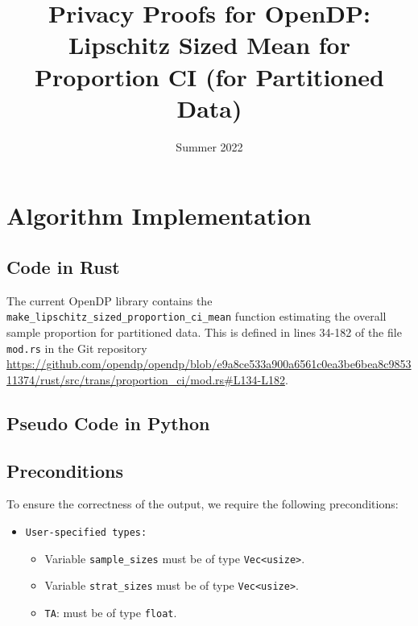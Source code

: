 \documentclass[11pt,a4paper]{article}
\title{Privacy Proofs for OpenDP: Lipschitz Sized Mean for Proportion CI (for Partitioned Data)}
\author{}
\date{Summer 2022}
\begin{document}
\maketitle
\tableofcontents


\section{Algorithm Implementation}





\subsection{Code in Rust}



The current OpenDP library contains the \texttt{make\_lipschitz\_sized\_proportion\_ci\_mean} function estimating the overall sample proportion for partitioned data. This is defined 
in lines 34-182 of the file \texttt{mod.rs}
in the Git repository \url{https://github.com/opendp/opendp/blob/e9a8ce533a900a6561c0ea3be6bea8c985311374/rust/src/trans/proportion_ci/mod.rs#L134-L182}.



\subsection{Pseudo Code in Python} \label{sec:pseudocode}

\subsection*{Preconditions}
To ensure the correctness of the output, we require the following preconditions:

\begin{itemize}
    \item \texttt{User-specified types:}
    \begin{itemize}
        \item Variable \texttt{sample\_sizes} must be of type \texttt{Vec<usize>}. 
        \item Variable \texttt{strat\_sizes} must be of type \texttt{Vec<usize>}. 
        \item \texttt{TA}: must be of type  \texttt{float}.
    \end{itemize}
    
\end{itemize}
\end{document}
